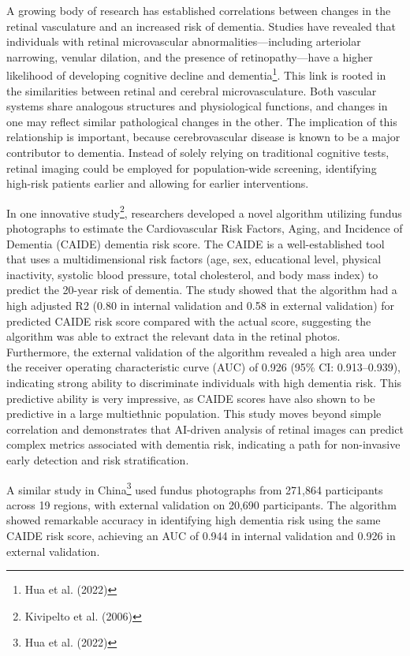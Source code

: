 \documentclass[
  Letterpaper,
]{scrbook}
\begin{document}
A growing body of research has established correlations between changes
in the retinal vasculature and an increased risk of dementia. Studies
have revealed that individuals with retinal microvascular
abnormalities---including arteriolar narrowing, venular dilation, and
the presence of retinopathy---have a higher likelihood of developing
cognitive decline and dementia\footnote{Hua et al. (2022)}. This link is
rooted in the similarities between retinal and cerebral
microvasculature. Both vascular systems share analogous structures and
physiological functions, and changes in one may reflect similar
pathological changes in the other. The implication of this relationship
is important, because cerebrovascular disease is known to be a major
contributor to dementia. Instead of solely relying on traditional
cognitive tests, retinal imaging could be employed for population-wide
screening, identifying high-risk patients earlier and allowing for
earlier interventions.

In one innovative study\footnote{Kivipelto et al. (2006)}, researchers
developed a novel algorithm utilizing fundus photographs to estimate the
Cardiovascular Risk Factors, Aging, and Incidence of Dementia (CAIDE)
dementia risk score. The CAIDE is a well-established tool that uses a
multidimensional risk factors (age, sex, educational level, physical
inactivity, systolic blood pressure, total cholesterol, and body mass
index) to predict the 20-year risk of dementia. The study showed that
the algorithm had a high adjusted R2 (0.80 in internal validation and
0.58 in external validation) for predicted CAIDE risk score compared
with the actual score, suggesting the algorithm was able to extract the
relevant data in the retinal photos. Furthermore, the external
validation of the algorithm revealed a high area under the receiver
operating characteristic curve (AUC) of 0.926 (95\% CI: 0.913--0.939),
indicating strong ability to discriminate individuals with high dementia
risk. This predictive ability is very impressive, as CAIDE scores have
also shown to be predictive in a large multiethnic population. This
study moves beyond simple correlation and demonstrates that AI-driven
analysis of retinal images can predict complex metrics associated with
dementia risk, indicating a path for non-invasive early detection and
risk stratification.

A similar study in China\footnote{Hua et al. (2022)} used fundus
photographs from 271,864 participants across 19 regions, with external
validation on 20,690 participants. The algorithm showed remarkable
accuracy in identifying high dementia risk using the same CAIDE risk
score, achieving an AUC of 0.944 in internal validation and 0.926 in
external validation.
\end{document}
